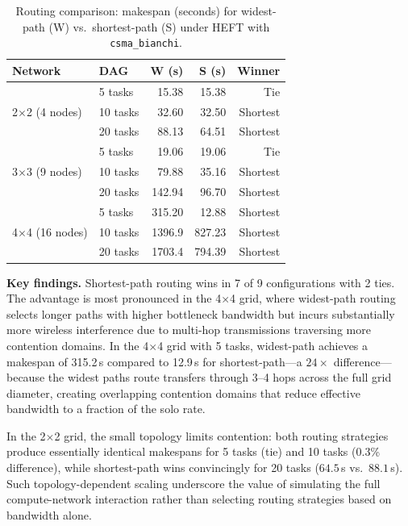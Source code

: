 \documentclass[conference]{IEEEtran}
\begin{document}
\begin{table}[t]
\centering
\caption{Routing comparison: makespan (seconds) for widest-path (W) vs.\
shortest-path (S) under HEFT with \texttt{csma\_bianchi}.}
\label{tab:routing}
\begin{tabular}{@{}llrrr@{}}
\toprule
\textbf{Network} & \textbf{DAG} & \textbf{W (s)} & \textbf{S (s)} & \textbf{Winner} \\
\midrule
\multirow{3}{*}{2$\times$2 (4 nodes)}
  & 5 tasks   & 15.38  & 15.38  & Tie \\
  & 10 tasks  & 32.60  & 32.50  & Shortest \\
  & 20 tasks  & 88.13  & 64.51  & Shortest \\
\midrule
\multirow{3}{*}{3$\times$3 (9 nodes)}
  & 5 tasks   & 19.06  & 19.06  & Tie \\
  & 10 tasks  & 79.88  & 35.16  & Shortest \\
  & 20 tasks  & 142.94 & 96.70  & Shortest \\
\midrule
\multirow{3}{*}{4$\times$4 (16 nodes)}
  & 5 tasks   & 315.20 & 12.88  & Shortest \\
  & 10 tasks  & 1396.9 & 827.23 & Shortest \\
  & 20 tasks  & 1703.4 & 794.39 & Shortest \\
\bottomrule
\end{tabular}
\end{table}

\textbf{Key findings.}
Shortest-path routing wins in 7 of 9 configurations with 2 ties.  The
advantage is most pronounced in the 4$\times$4 grid, where widest-path
routing selects longer paths with higher bottleneck bandwidth but incurs
substantially more wireless interference due to multi-hop transmissions
traversing more contention domains.  In the 4$\times$4 grid with 5 tasks,
widest-path achieves a makespan of 315.2\,s compared to 12.9\,s for
shortest-path---a $24\times$ difference---because the widest paths route
transfers through 3--4 hops across the full grid diameter, creating
overlapping contention domains that reduce effective bandwidth to a
fraction of the solo rate.

In the 2$\times$2 grid, the small topology limits contention: both
routing strategies produce essentially identical makespans for 5 tasks
(tie) and 10 tasks (0.3\% difference), while shortest-path wins
convincingly for 20 tasks ($64.5$\,s vs.\ $88.1$\,s).
Such topology-dependent scaling underscore the value of simulating the
full compute-network interaction rather than selecting routing strategies
based on bandwidth alone.
\end{document}
